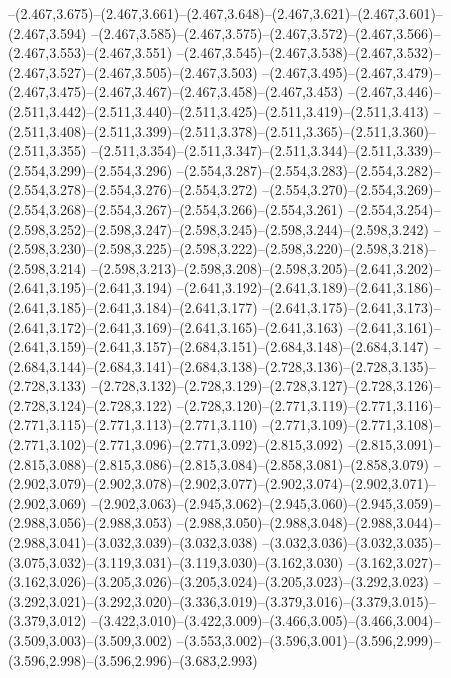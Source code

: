   --(2.467,3.675)--(2.467,3.661)--(2.467,3.648)--(2.467,3.621)--(2.467,3.601)--(2.467,3.594)%
  --(2.467,3.585)--(2.467,3.575)--(2.467,3.572)--(2.467,3.566)--(2.467,3.553)--(2.467,3.551)%
  --(2.467,3.545)--(2.467,3.538)--(2.467,3.532)--(2.467,3.527)--(2.467,3.505)--(2.467,3.503)%
  --(2.467,3.495)--(2.467,3.479)--(2.467,3.475)--(2.467,3.467)--(2.467,3.458)--(2.467,3.453)%
  --(2.467,3.446)--(2.511,3.442)--(2.511,3.440)--(2.511,3.425)--(2.511,3.419)--(2.511,3.413)%
  --(2.511,3.408)--(2.511,3.399)--(2.511,3.378)--(2.511,3.365)--(2.511,3.360)--(2.511,3.355)%
  --(2.511,3.354)--(2.511,3.347)--(2.511,3.344)--(2.511,3.339)--(2.554,3.299)--(2.554,3.296)%
  --(2.554,3.287)--(2.554,3.283)--(2.554,3.282)--(2.554,3.278)--(2.554,3.276)--(2.554,3.272)%
  --(2.554,3.270)--(2.554,3.269)--(2.554,3.268)--(2.554,3.267)--(2.554,3.266)--(2.554,3.261)%
  --(2.554,3.254)--(2.598,3.252)--(2.598,3.247)--(2.598,3.245)--(2.598,3.244)--(2.598,3.242)%
  --(2.598,3.230)--(2.598,3.225)--(2.598,3.222)--(2.598,3.220)--(2.598,3.218)--(2.598,3.214)%
  --(2.598,3.213)--(2.598,3.208)--(2.598,3.205)--(2.641,3.202)--(2.641,3.195)--(2.641,3.194)%
  --(2.641,3.192)--(2.641,3.189)--(2.641,3.186)--(2.641,3.185)--(2.641,3.184)--(2.641,3.177)%
  --(2.641,3.175)--(2.641,3.173)--(2.641,3.172)--(2.641,3.169)--(2.641,3.165)--(2.641,3.163)%
  --(2.641,3.161)--(2.641,3.159)--(2.641,3.157)--(2.684,3.151)--(2.684,3.148)--(2.684,3.147)%
  --(2.684,3.144)--(2.684,3.141)--(2.684,3.138)--(2.728,3.136)--(2.728,3.135)--(2.728,3.133)%
  --(2.728,3.132)--(2.728,3.129)--(2.728,3.127)--(2.728,3.126)--(2.728,3.124)--(2.728,3.122)%
  --(2.728,3.120)--(2.771,3.119)--(2.771,3.116)--(2.771,3.115)--(2.771,3.113)--(2.771,3.110)%
  --(2.771,3.109)--(2.771,3.108)--(2.771,3.102)--(2.771,3.096)--(2.771,3.092)--(2.815,3.092)%
  --(2.815,3.091)--(2.815,3.088)--(2.815,3.086)--(2.815,3.084)--(2.858,3.081)--(2.858,3.079)%
  --(2.902,3.079)--(2.902,3.078)--(2.902,3.077)--(2.902,3.074)--(2.902,3.071)--(2.902,3.069)%
  --(2.902,3.063)--(2.945,3.062)--(2.945,3.060)--(2.945,3.059)--(2.988,3.056)--(2.988,3.053)%
  --(2.988,3.050)--(2.988,3.048)--(2.988,3.044)--(2.988,3.041)--(3.032,3.039)--(3.032,3.038)%
  --(3.032,3.036)--(3.032,3.035)--(3.075,3.032)--(3.119,3.031)--(3.119,3.030)--(3.162,3.030)%
  --(3.162,3.027)--(3.162,3.026)--(3.205,3.026)--(3.205,3.024)--(3.205,3.023)--(3.292,3.023)%
  --(3.292,3.021)--(3.292,3.020)--(3.336,3.019)--(3.379,3.016)--(3.379,3.015)--(3.379,3.012)%
  --(3.422,3.010)--(3.422,3.009)--(3.466,3.005)--(3.466,3.004)--(3.509,3.003)--(3.509,3.002)%
  --(3.553,3.002)--(3.596,3.001)--(3.596,2.999)--(3.596,2.998)--(3.596,2.996)--(3.683,2.993)%

